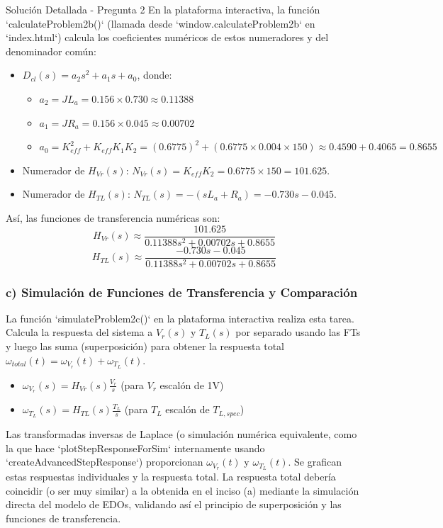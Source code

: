 \documentclass[12pt]{article}
\begin{document}
\begin{solutionbox}{Solución Detallada - Pregunta 2}
En la plataforma interactiva, la función `calculateProblem2b()` (llamada desde `window.calculateProblem2b` en `index.html`) calcula los coeficientes numéricos de estos numeradores y del denominador común:
\begin{itemize}
    \item $D_{cl}(s) = a_2 s^2 + a_1 s + a_0$, donde:
    \begin{itemize}
        \item $a_2 = JL_a = 0.156 \times 0.730 \approx 0.11388$
        \item $a_1 = JR_a = 0.156 \times 0.045 \approx 0.00702$
        \item $a_0 = K_{eff}^2 + K_{eff}K_1K_2 = (0.6775)^2 + (0.6775 \times 0.004 \times 150) \approx 0.4590 + 0.4065 = 0.8655$
    \end{itemize}
    \item Numerador de $H_{Vr}(s)$: $N_{Vr}(s) = K_{eff}K_2 = 0.6775 \times 150 = 101.625$.
    \item Numerador de $H_{TL}(s)$: $N_{TL}(s) = -(sL_a + R_a) = -0.730s - 0.045$.
\end{itemize}
Así, las funciones de transferencia numéricas son:
\[ H_{Vr}(s) \approx \frac{101.625}{0.11388s^2 + 0.00702s + 0.8655} \]
\[ H_{TL}(s) \approx \frac{-0.730s - 0.045}{0.11388s^2 + 0.00702s + 0.8655} \]

\subsubsection*{c) Simulación de Funciones de Transferencia y Comparación}
La función `simulateProblem2c()` en la plataforma interactiva realiza esta tarea. Calcula la respuesta del sistema a $V_r(s)$ y $T_L(s)$ por separado usando las FTs y luego las suma (superposición) para obtener la respuesta total $\omega_{total}(t) = \omega_{V_r}(t) + \omega_{T_L}(t)$.
\begin{itemize}
    \item $\omega_{V_r}(s) = H_{Vr}(s) \frac{V_r}{s}$ (para $V_r$ escalón de 1V)
    \item $\omega_{T_L}(s) = H_{TL}(s) \frac{T_L}{s}$ (para $T_L$ escalón de $T_{L,spec}$)
\end{itemize}
Las transformadas inversas de Laplace (o simulación numérica equivalente, como la que hace `plotStepResponseForSim` internamente usando `createAdvancedStepResponse`) proporcionan $\omega_{V_r}(t)$ y $\omega_{T_L}(t)$. Se grafican estas respuestas individuales y la respuesta total. La respuesta total debería coincidir (o ser muy similar) a la obtenida en el inciso (a) mediante la simulación directa del modelo de EDOs, validando así el principio de superposición y las funciones de transferencia.


\end{solutionbox}
\end{document}
